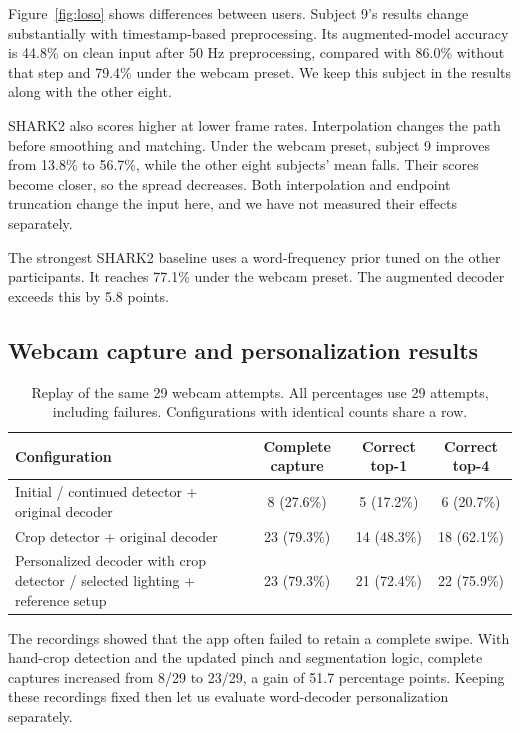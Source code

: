 \documentclass[preprint,12pt]{elsarticle}
\begin{document}
Figure~\ref{fig:loso} shows differences between users. Subject 9's results change substantially with timestamp-based preprocessing. Its augmented-model accuracy is 44.8\% on clean input after 50 Hz preprocessing, compared with 86.0\% without that step and 79.4\% under the webcam preset. We keep this subject in the results along with the other eight.

SHARK2 also scores higher at lower frame rates. Interpolation changes the path before smoothing and matching. Under the webcam preset, subject 9 improves from 13.8\% to 56.7\%, while the other eight subjects' mean falls. Their scores become closer, so the spread decreases. Both interpolation and endpoint truncation change the input here, and we have not measured their effects separately.

The strongest SHARK2 baseline uses a word-frequency prior tuned on the other participants. It reaches 77.1\% under the webcam preset. The augmented decoder exceeds this by 5.8 points.

\subsection{Webcam capture and personalization results}
\begin{table}[H]
\centering
\caption{Replay of the same 29 webcam attempts. All percentages use 29 attempts, including failures. Configurations with identical counts share a row.}
\label{tab:webcam}
\begingroup\small{}
\begin{tabularx}{\linewidth}{Xccc}
\toprule
Configuration & Complete capture & Correct top-1 & Correct top-4 \\
\midrule
Initial / continued detector + original decoder & 8 (27.6\%) & 5 (17.2\%) & 6 (20.7\%) \\
Crop detector + original decoder & 23 (79.3\%) & 14 (48.3\%) & 18 (62.1\%) \\
Personalized decoder with crop detector / selected lighting + reference setup & 23 (79.3\%) & 21 (72.4\%) & 22 (75.9\%) \\
\bottomrule
\end{tabularx}
\endgroup
\end{table}

The recordings showed that the app often failed to retain a complete swipe. With hand-crop detection and the updated pinch and segmentation logic, complete captures increased from 8/29 to 23/29, a gain of 51.7 percentage points. Keeping these recordings fixed then let us evaluate word-decoder personalization separately.
\end{document}
